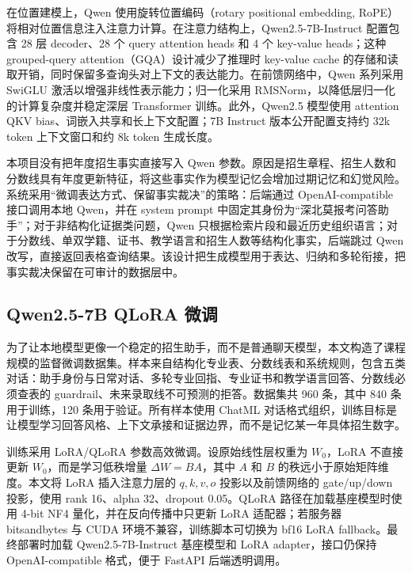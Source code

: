 \documentclass[UTF8,a4paper,11pt]{ctexart}
\begin{document}
在位置建模上，Qwen 使用旋转位置编码（rotary positional embedding, RoPE）将相对位置信息注入注意力计算\cite{su2024roformer}。在注意力结构上，Qwen2.5-7B-Instruct 配置包含 28 层 decoder、28 个 query attention heads 和 4 个 key-value heads；这种 grouped-query attention（GQA）设计减少了推理时 key-value cache 的存储和读取开销，同时保留多查询头对上下文的表达能力\cite{ainslie2023gqa,qwen25modelcard}。在前馈网络中，Qwen 系列采用 SwiGLU 激活以增强非线性表示能力\cite{shazeer2020glu,qwen2024technical}；归一化采用 RMSNorm，以降低层归一化的计算复杂度并稳定深层 Transformer 训练\cite{zhang2019rmsnorm,qwen2024technical}。此外，Qwen2.5 模型使用 attention QKV bias、词嵌入共享和长上下文配置；7B Instruct 版本公开配置支持约 32k token 上下文窗口和约 8k token 生成长度\cite{qwen25modelcard}。

本项目没有把年度招生事实直接写入 Qwen 参数。原因是招生章程、招生人数和分数线具有年度更新特征，将这些事实作为模型记忆会增加过期记忆和幻觉风险。系统采用“微调表达方式、保留事实裁决”的策略：后端通过 OpenAI-compatible 接口调用本地 Qwen，并在 system prompt 中固定其身份为“深北莫报考问答助手”；对于非结构化证据类问题，Qwen 只根据检索片段和最近历史组织语言；对于分数线、单双学籍、证书、教学语言和招生人数等结构化事实，后端跳过 Qwen 改写，直接返回表格查询结果。该设计把生成模型用于表达、归纳和多轮衔接，把事实裁决保留在可审计的数据层中。

\subsection{Qwen2.5-7B QLoRA 微调}

为了让本地模型更像一个稳定的招生助手，而不是普通聊天模型，本文构造了课程规模的监督微调数据集。样本来自结构化专业表、分数线表和系统规则，包含五类对话：助手身份与日常对话、多轮专业回指、专业证书和教学语言回答、分数线必须查表的 guardrail、未来录取线不可预测的拒答。数据集共 960 条，其中 840 条用于训练，120 条用于验证。所有样本使用 ChatML 对话格式组织，训练目标是让模型学习回答风格、上下文承接和证据边界，而不是记忆某一年具体招生数字。

训练采用 LoRA/QLoRA 参数高效微调\cite{hu2022lora,dettmers2023qlora}。设原始线性层权重为 $W_0$，LoRA 不直接更新 $W_0$，而是学习低秩增量 $\Delta W=BA$，其中 $A$ 和 $B$ 的秩远小于原始矩阵维度。本文将 LoRA 插入注意力层的 $q,k,v,o$ 投影以及前馈网络的 gate/up/down 投影，使用 rank 16、alpha 32、dropout 0.05。QLoRA 路径在加载基座模型时使用 4-bit NF4 量化，并在反向传播中只更新 LoRA 适配器；若服务器 bitsandbytes 与 CUDA 环境不兼容，训练脚本可切换为 bf16 LoRA fallback。最终部署时加载 Qwen2.5-7B-Instruct 基座模型和 LoRA adapter，接口仍保持 OpenAI-compatible 格式，便于 FastAPI 后端透明调用。
\end{document}
